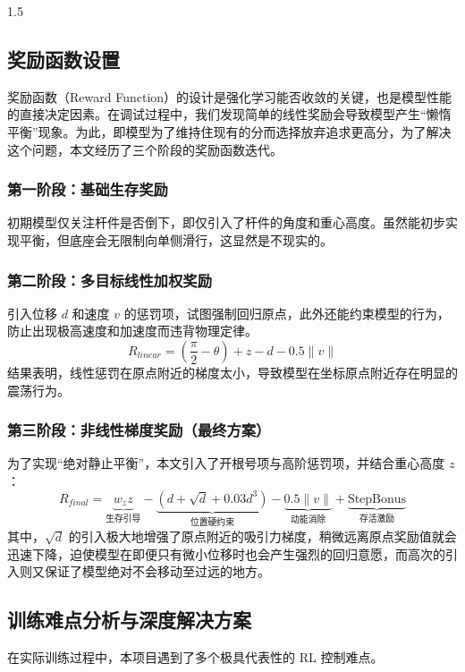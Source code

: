 \documentclass[zihao=-4]{ctexart}
\begin{document}
\begin{spacing}{1.5}
\subsection{奖励函数设置}
奖励函数（Reward Function）的设计是强化学习能否收敛的关键，也是模型性能的直接决定因素。在调试过程中，我们发现简单的线性奖励会导致模型产生“懒惰平衡”现象。为此，即模型为了维持住现有的分而选择放弃追求更高分，为了解决这个问题，本文经历了三个阶段的奖励函数迭代。

\subsubsection{第一阶段：基础生存奖励}
初期模型仅关注杆件是否倒下，即仅引入了杆件的角度和重心高度。虽然能初步实现平衡，但底座会无限制向单侧滑行，这显然是不现实的。

\subsubsection{第二阶段：多目标线性加权奖励}
引入位移 $d$ 和速度 $v$ 的惩罚项，试图强制回归原点，此外还能约束模型的行为，防止出现极高速度和加速度而违背物理定律。
\begin{equation}
R_{linear} = (\frac{\pi}{2} - \theta) + z - d - 0.5\|v\|
\end{equation}
结果表明，线性惩罚在原点附近的梯度太小，导致模型在坐标原点附近存在明显的震荡行为。

\subsubsection{第三阶段：非线性梯度奖励（最终方案）}
为了实现“绝对静止平衡”，本文引入了开根号项与高阶惩罚项，并结合重心高度 $z$：
\begin{equation}
R_{final} = \underbrace{w_z z}_\text{生存引导} - \underbrace{(d + \sqrt{d} + 0.03 d^3)}_\text{位置硬约束} - \underbrace{0.5 \|v\|}_\text{动能消除} + \underbrace{\text{StepBonus}}_\text{存活激励}\label{eq:equation}
\end{equation}
其中，$\sqrt{d}$ 的引入极大地增强了原点附近的吸引力梯度，稍微远离原点奖励值就会迅速下降，迫使模型在即便只有微小位移时也会产生强烈的回归意愿，而高次的引入则又保证了模型绝对不会移动至过远的地方。

\subsection{训练难点分析与深度解决方案}
在实际训练过程中，本项目遇到了多个极具代表性的 RL 控制难点。


\end{spacing}
\end{document}
